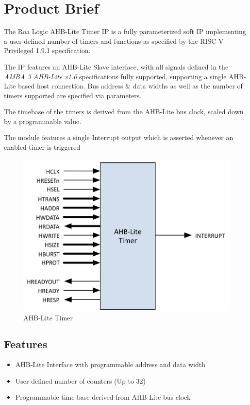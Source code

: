 \chapter{Product Brief} \label{product-brief}

The Roa Logic AHB-Lite Timer IP is a fully parameterized soft IP
implementing a user-defined number of timers and functions as specified
by the RISC-V Privileged 1.9.1 specification.

The IP features an AHB-Lite Slave interface, with all signals defined in
the \emph{AMBA 3 AHB-Lite v1.0} specifications fully supported,
supporting a single AHB-Lite based host connection. Bus address \& data
widths as well as the number of timers supported are specified via
parameters.

The timebase of the timers is derived from the AHB-Lite bus clock,
scaled down by a programmable value.

The module features a single Interrupt output which is asserted whenever
an enabled timer is triggered

\begin{figure}[tbh]
	\includegraphics{assets/img/AHB-Lite-Timer-sig.png}
	\caption{AHB-Lite Timer}
	\label{fig:ahb-lite-timer-sig}
\end{figure}

\section{Features}\label{features}

\begin{itemize}
\item
  AHB-Lite Interface with programmable address and data width
\item
  User defined number of counters (Up to 32)
\item
  Programmable time base derived from AHB-Lite bus clock
\end{itemize}
